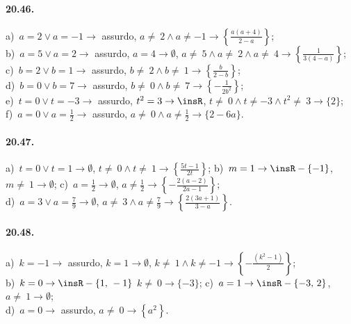 \paragraph{20.46.}
a)~$a=2\vee a=-1 \rightarrow$ assurdo, $a\neq~2\wedge a\neq -1 \rightarrow \left\{\frac{a(a+4)}{2-a}\right\}$;
\protect\\ b)~$a=5\vee a=2 \rightarrow$ assurdo, $a=4 \rightarrow \emptyset$, $a\neq~5\wedge a\neq~2\wedge a\neq~4 \rightarrow \left\{\frac{1}{3(4-a)}\right\}$;
\protect\\ c)~$b=2\vee b=1 \rightarrow$ assurdo, $b\neq~2\wedge b\neq~1 \rightarrow \left\{\frac{b}{2-b}\right\}$;
\protect\\ d)~$b=0\vee b=7\rightarrow$ assurdo, $b\neq~0\wedge b\neq~7 \rightarrow \left\{-{\frac{1}{2b^{2}}}\right\}$;
\protect\\ e)~$t=0\vee t=-3 \rightarrow$ assurdo, $t^{2}=3 \rightarrow \insR$, $t\neq~0\wedge t\neq -3\wedge t^{2}\neq~3 \rightarrow \{2\}$;
\protect\\ f)~$a=0\vee a=\frac{1}{2} \rightarrow$ assurdo, $a\neq~0\wedge a\neq \frac{1}{2} \rightarrow \{2-6a\}$.

\paragraph{20.47.}
a)~$t=0\vee t=1 \rightarrow \emptyset$, $t\neq~0\wedge t\neq~1 \rightarrow \left\{\frac{5t-1}{2t}\right\}$;
\quad b)~$m=1 \rightarrow \insR-\{-1\}$, $m\neq~1 \rightarrow \emptyset$;
\quad c)~$a=\frac{1}{2} \rightarrow \emptyset$, $a\neq \frac{1}{2} \rightarrow \left\{-{\frac{2(a-2)}{2a-1}}\right\}$;
\protect\\ d)~$a=3\vee a=\frac{7}{9} \rightarrow \emptyset$, $a\neq~3\wedge a\neq \frac{7}{9} \rightarrow \left\{\frac{2(3a+1)}{3-a}\right\}$.

\paragraph{20.48.}
a)~$k=-1 \rightarrow$ assurdo, $k=1 \rightarrow \emptyset$, $k\neq~1\wedge k\neq -1 \rightarrow \left\{-{\frac{\left(k^2-1\right)}{2}}\right\}$;
\protect\\ b)~$k=0 \rightarrow \insR-\{1\text{,~}-1\}$ $k\neq~0 \rightarrow \{-3\}$; c)~$a=1 \rightarrow \insR-\{-3\text{,~}2\}$, $a\neq~1 \rightarrow \emptyset$;
\protect\\ d)~$a=0 \rightarrow$ assurdo, $a\neq~0 \rightarrow \left\{a^{2}\right\}$.

